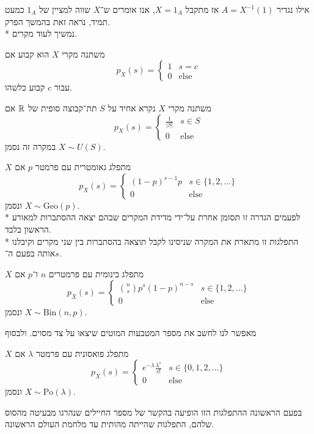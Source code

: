 אילו נגדיר $A = X^{-1}(1)$ אז מתקבל $X = 1_A$, אנו אומרים ש־$X$ שווה למציין של $1_A$ כמעט תמיד, נראה זאת בהמשך הפרק. \\*
נמשיך לעוד מקרים.
\begin{definition}
	משתנה מקרי $X$ הוא קבוע אם
	\[
		p_X(s) = \begin{cases}
			1 & s = c \\
			0 & \text{else}
		\end{cases}
	\]
	עבור $c$ קבוע כלשהו.
\end{definition}
\begin{definition}
	משתנה מקרי $X$ נקרא אחיד על $S$ תת־קבוצה סופית של $\mathbb{R}$ אם
	\[
		p_X(s) = \begin{cases}
			\frac{1}{|S|} & s \in S \\
			0 & \text{else}
		\end{cases}
	\]
	במקרה זה נסמן $X \sim U(S)$.
\end{definition}
\begin{definition}
	$X$ מתפלג גאומטרית עם פרמטר $p$ אם
	\[
		p_X(s) = \begin{cases}
			{(1 - p)}^{s - 1} p & s \in \{1, 2, \dots \} \\
			0 & \text{else}
		\end{cases}
	\]
	ונסמן $X \sim \text{Geo}(p)$. \\*
	לפעמים הגדרה זו תסומן אחרת על־ידי מדידת המקרים שבהם יצאה ההסתברות למאורע הראשון בלבד. \\*
	התפלגות זו מתארת את המקרה שניסינו לקבל תוצאה בהסתברות בין שני מקרים וקיבלנו אותה בפעם ה־$s$.
\end{definition}
\begin{definition}
	$X$ מתפלג בינומית עם פרמטרים $n$ ו־$p$ אם
	\[
		p_X(s) = \begin{cases}
			\binom{n}{s} p^s {(1 - p)}^{n - s} & s \in \{1, 2, \dots\} \\
			0 & \text{else}
		\end{cases}
	\]
	ונסמן $X \sim \text{Bin}(n, p)$.
\end{definition}
מאפשר לנו לחשב את מספר המטבעות המוטים שיצאו על צד מסוים.
ולבסוף
\begin{definition}
	$X$ מתפלג פואסונית עם פרמטר $\lambda$ אם
	\[
		p_X(s) = \begin{cases}
			e^{-\lambda} \frac{\lambda^s}{s!} & s \in \{0, 1, 2, \dots\} \\
			0 & \text{else}
		\end{cases}
	\]
	ונסמן $X \sim \text{Po}(\lambda)$.
\end{definition}
בפעם הראשונה ההתפלגות הזו הופיעה בהקשר של מספר החיילים שנהרגו מבעיטה מהסוס שלהם, התפלגות שהייתה מהותית עד מלחמת העולם הראשונה.

